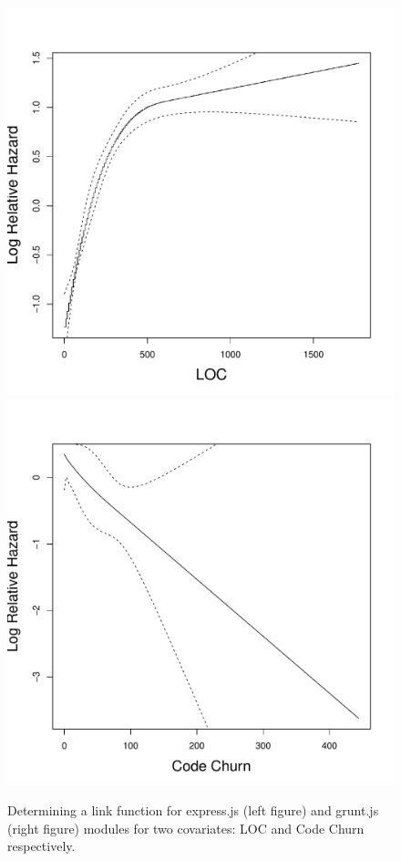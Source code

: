 \begin{figure}[!htbp]
\centering
\captionsetup{font=small}
  \includegraphics[width=\linewidth]{pdfs/linkExpress.pdf}
\endminipage
{}
  \includegraphics[width=\linewidth]{pdfs/linkTotalChurnGrunt.pdf}
\endminipage
\caption{Determining a link function for express.js (left figure) and grunt.js (right figure) modules for two covariates: LOC and Code Churn respectively.\vspace{-10pt}}\label{link}
\end{figure}

